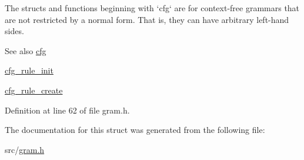 \-The structs and functions beginning with `cfg` are for context-\/free grammars that are not restricted by a normal form. \-That is, they can have arbitrary left-\/hand sides.

\begin{DoxySeeAlso}{\-See also}
\hyperlink{structcfg}{cfg} 

\hyperlink{gram_8h_a956bd96a97a392e63afe06eb92c110df}{cfg\-\_\-rule\-\_\-init} 

\hyperlink{gram_8h_a5ec2c946aabf126e8d76e22894a3e63d}{cfg\-\_\-rule\-\_\-create} 
\end{DoxySeeAlso}


\-Definition at line 62 of file gram.\-h.



\-The documentation for this struct was generated from the following file\-:\begin{DoxyCompactItemize}
\item 
src/\hyperlink{gram_8h}{gram.\-h}\end{DoxyCompactItemize}
